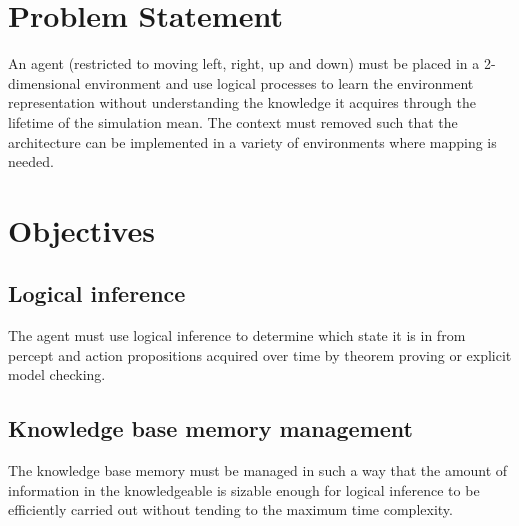 \section{Problem Statement}



An agent (restricted to moving left, right, up and down) must be placed in a 2-dimensional environment and use logical processes to learn the environment representation without understanding the knowledge it acquires through the lifetime of the simulation mean. The context must removed such that the architecture can be implemented in a variety of environments where mapping is needed.  



\section{Objectives}


\subsection{Logical inference}
The agent must use logical inference to determine which state it is in from percept and action propositions acquired over time by theorem proving or explicit model checking. 
	
\subsection{Knowledge base memory management}
The knowledge base memory must be managed in such a way that the amount of information in the knowledgeable is sizable enough for logical inference to be efficiently carried out without tending to the maximum time complexity.
	
